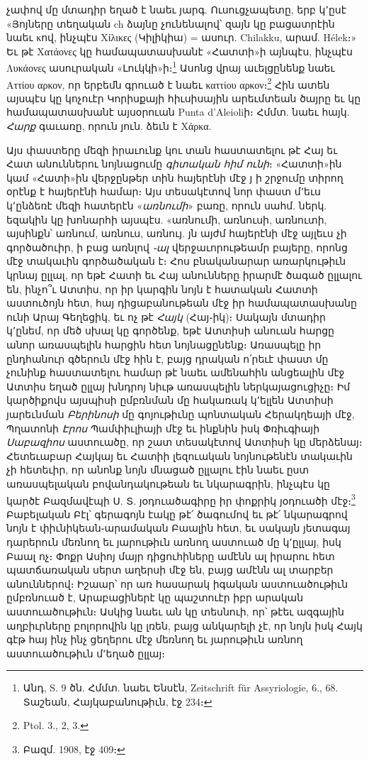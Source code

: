 \documentclass{article}
\begin{document}
{չափով մը մտադիր եղած է նաեւ յարգ. Ուսուցչապետը, երբ կ՚ըսէ «Յոյները տեղական ch ձայնը չունենալով՝ զայն կը բացատրէին նաեւ κով, ինչպէս Χίλικες (Կիլիկիա) = ասուր. Chilakku, արամ. Hélek։» Եւ թէ Χατάονες կը համապատասխանէ «Հատտի»ի այնպէս, ինչպէս Λυκάονες ասուրական «Լուկկի»ի։\footnote{Անդ, S. 9 ծն. Հմմտ. նաեւ Ենսէն, Zeitschrift für Assyriologie, 6., 68. Տաշեան, Հայկաբանութիւն, էջ 234։} Ասոնց վրայ աւելցընենք նաեւ Αττίου αρκον, որ երբեմն գրուած է նաեւ καττίου αρκον։\footnote{Ptol. 3., 2, 3.} Հին ատեն այսպէս կը կոչուէր Կորիսքայի հիւսիսային արեւմտեան ծայրը եւ կը համապատասխանէ այսօրուան Punta d'Aleioliի։ Հմմտ. նաեւ հայկ. \emph{Հարք} գաւառը, որուն յուն. ձեւն է Χάρκα.

Այս փաստերը մեզի իրաւունք կու տան հաստատելու թէ Հայ եւ Հատ անուններու նոյնացումը \emph{գիտական հիմ ունի}։ «Հատտի»ին կամ «Հատի»ին վերջընթեր տին հայերէնի մէջ յ ի շրջումը տիրող օրէնք է հայերէնի համար։ Այս տեսակէտով նոր փաստ մ՚եւս կ՚ընձեռէ մեզի հատերէն «\emph{առնումի}» բառը, որուն սահմ. ներկ. եզակին կը խոնարհի այսպէս. «առնումի, առնուսի, առնուտի, այսինքն՝ առնում, առնուս, առնույ. յն այժմ հայերէնի մէջ այլեւս չի գործածուիր, ի բաց առնլով \emph{֊ալ} վերջաւորութեամր բայերը, որոնց մէջ տակաւին գործածական է։ Հոս բնականարար առարկութիւն կրնայ ըլլալ, որ եթէ Հատի եւ Հայ անունները իրարմէ ծագած ըլլալու են, ինչո՞ւ Ատտիս, որ իր կարգին նոյն է հատական Հատտի աստուծոյն հետ, հայ դիցաբանութեան մէջ իր համապատասխանը ունի Արայ Գեղեցիկ, եւ ոչ թէ \emph{Հայկ} (Հայ֊իկ)։ Սակայն մտադիր կ՚ընեմ, որ մեծ սխալ կը գործենք, եթէ Ատտիսի անուան հարցը անոր առասպելին հարցին հետ նոյնացընենք։ Առասպելը իր ընդհանուր գծերուն մէջ հին է, բայց դրական ո՛րեւէ փաստ մը չունինք հաստատելու համար թէ նաեւ ամենահին անցեալին մէջ Ատտիս եղած ըլլայ խնդրոյ նիւթ առասպելին ներկայացուցիչը։ Իմ կարծիքովս այսպիսի ըմբռնման մը հակառակ կ՚ելլեն Ատտիսի յարեւնման \emph{Բերինոսի} մը գոյութիւնը պոնտական Հերակղեայի մէջ, Պղատոնի \emph{Էրոս} Պամփիւլիայի մէջ եւ ինքնին իսկ Փռիւգիայի \emph{Սաբազիոս} աստուածը, որ շատ տեսակէտով Ատտիսի կը մերձենայ։ Հետեւաբար Հայկայ եւ Հատիի լեզուական նոյնութենէն տակաւին չի հետեւիր, որ անոնք նոյն մնացած ըլլալու էին նաեւ ըստ առասպելական բովանդակութեան եւ նկարագրին, ինչպէս կը կարծէ Բազմավէպի Ս. Տ. յօդուածագիրը իր փոքրիկ յօդուածի մէջ։\footnote{Բազմ. 1908, էջ 409։} Բաբելական Բէլ՝ գերագոյն էակը թէ՛ ծագումով եւ թէ՛ նկարագրով նոյն է փիւնիկեան֊արամական Բաալին հետ, եւ սակայն յետագայ դարերուն մեռնող եւ յարութիւն առնող աստուած մը կ՚ըլլայ, իսկ Բաալ ոչ։ Փոքր Ասիոյ մայր դիցուհիները ամէնն ալ իրարու հետ պատճառական սերտ աղերսի մէջ են, բայց ամէնն ալ տարբեր անուններով։ Իշաար՝ որ առ հասարակ իգական աստուածութիւն ըմբռնուած է, Արաբացիներէ կը պաշտուէր իբր արական աստուածութիւն։ Ասկից նաեւ ան կը տեսնուի, որ՝ թէեւ ազգային աղբիւրները բոլորովին կը լռեն, բայց անկարելի չէ, որ նոյն իսկ Հայկ գէթ հայ ինչ ինչ ցեղերու մէջ մեռնող եւ յարութիւն առնող աստուածութիւն մ՚եղած ըլլայ։

}
\end{document}
